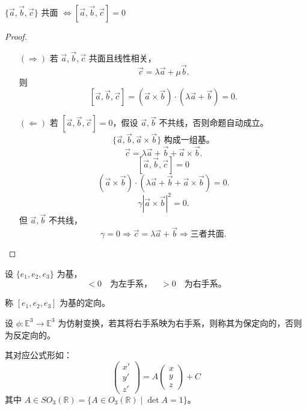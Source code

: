 \documentclass[lang=cn,10pt,thmcnt=section]{elegantbook}
\begin{document}
\begin{proposition}
    $\{\vec{a}, \vec{b}, \vec{c}\}$ 共面 $\Leftrightarrow [\vec{a}, \vec{b}, \vec{c}] = 0$
\end{proposition}
\begin{proof}
    \begin{itemize}
        \item[$(\Rightarrow)$] 若 $\vec{a}, \vec{b}, \vec{c}$ 共面且线性相关，
        \[
        \vec{c} = \lambda \vec{a} + \mu \vec{b}.
        \]
        则
        \[
        [\vec{a}, \vec{b}, \vec{c}] = (\vec{a} \times \vec{b}) \cdot (\lambda \vec{a} + \vec{b}) = 0.
        \]
        
        \item[$(\Leftarrow)$] 若 $[\vec{a}, \vec{b}, \vec{c}] = 0$，假设 $\vec{a}, \vec{b}$ 不共线，否则命题自动成立。
        \[
        \{\vec{a}, \vec{b}, \vec{a} \times \vec{b}\} \text{ 构成一组基。}
        \]
        \[
        \vec{c} = \lambda \vec{a} + \vec{b} + \vec{a} \times \vec{b}.
        \]
        \[
        [\vec{a}, \vec{b}, \vec{c}] = 0
        \]
        \[
        (\vec{a} \times \vec{b}) \cdot (\lambda \vec{a} + \vec{b} + \vec{a} \times \vec{b}) = 0.
        \]
        \[
        \gamma |\vec{a} \times \vec{b}|^2 = 0.
        \]
        但 $\vec{a}, \vec{b}$ 不共线，
        \[
        \gamma = 0 \Rightarrow \vec{c} = \lambda \vec{a} + \vec{b} \Rightarrow \text{三者共面}.
        \]
    \end{itemize}
    \end{proof}
\begin{definition}[左手系和右手系]
    设 $\{e_1, e_2, e_3\}$ 为基，
    \begin{equation}
    [e_1, e_2, e_3] < 0 \quad \text{为左手系，} \quad > 0 \quad \text{为右手系。}
    \end{equation}
\end{definition}
\begin{definition}[定向]
    称 $[e_1, e_2, e_3]$ 为基的定向。
\end{definition}
\begin{definition}[保定向]
    设 $\phi: \mathbb{E}^3 \rightarrow \mathbb{E}^3$ 为仿射变换，若其将右手系映为右手系，则称其为保定向的，否则为反定向的。
\end{definition}
\begin{theorem}[刚体运动的坐标]
    其对应公式形如：
    \begin{equation}
    \begin{pmatrix}
    x' \\
    y' \\
    z'
    \end{pmatrix}
    = A
    \begin{pmatrix}
    x \\
    y \\
    z
    \end{pmatrix}
    + C
    \end{equation}
    其中 $A \in SO_3(\mathbb{R}) = \{A \in O_3(\mathbb{R}) \mid \det A = 1\}$。
\end{theorem}
\end{document}
